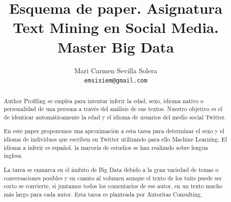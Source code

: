 \documentclass[11pt,a4paper]{article}
\title{Esquema de paper. Asignatura Text Mining en Social Media. Master Big Data}
\author{Mari Carmen Sevilla Solera \\
  {\tt emsisiem@gmail.com} \\}
\date{}
\begin{document}
\maketitle
\begin{abstract}
\justify 
Author Profiling se emplea para intentar inferir la edad, sexo, idioma nativo o personalidad de una persona a trav\'es del an\'alisis de sus textos. 
Nuestro objetivo es el de identicar autom\'aticamente la edad y el idioma de usuarios del medio social Twitter. \par\noindent
En este paper proponemos una aproximaci\'on a esta tarea para determinar el sexo y el idioma de  individuos que escriben en Twitter utilizando para ello Machine Learning. El idioma a inferir es español, la mayor\'ia de estudios se han realizado sobre lengua inglesa. \par\noindent
La tarea se enmarca en el \'ambito de Big Data debido a la gran variedad de temas o conversaciones posibles y en cuanto al volumen aunque el texto de los tuits puede ser corto se convierte, si juntamos todos los comentarios de ese autor, en un texto mucho m\'as largo para cada autor.
Esta tarea es planteada por Autoritas Consulting.
\end{abstract}
\end{document}

